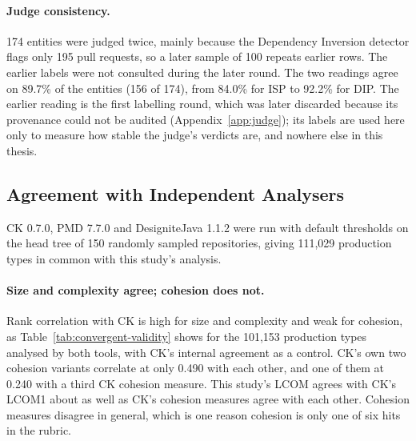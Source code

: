 \paragraph{Judge consistency.} 174 entities were judged twice, mainly because the Dependency
Inversion detector flags only 195 pull requests, so a later sample of 100 repeats earlier rows. The
earlier labels were not consulted during the later round. The two readings agree on 89.7\% of the
entities (156 of 174), from 84.0\% for ISP to 92.2\% for DIP. The earlier reading is the first
labelling round, which was later discarded because its provenance could not be audited
(Appendix~\ref{app:judge}); its labels are used here only to measure how stable the judge's verdicts
are, and nowhere else in this thesis.

\subsection{Agreement with Independent Analysers}
\label{sec:crosscheck-results}

CK 0.7.0, PMD 7.7.0 and DesigniteJava 1.1.2 were run with default thresholds on the head tree of
150 randomly sampled repositories, giving 111{,}029 production types in common with this study's
analysis.

\paragraph{Size and complexity agree; cohesion does not.} Rank correlation with CK is high for size
and complexity and weak for cohesion, as Table~\ref{tab:convergent-validity} shows for the 101{,}153 production types
analysed by both tools, with CK's internal agreement as a control. CK's own two cohesion
variants correlate at only 0.490 with each other, and one of them at 0.240 with a third CK cohesion
measure. This study's LCOM agrees with CK's LCOM1 about as well as CK's cohesion measures agree with
each other. Cohesion measures disagree in general, which is one reason cohesion is only one of six
hits in the rubric.

